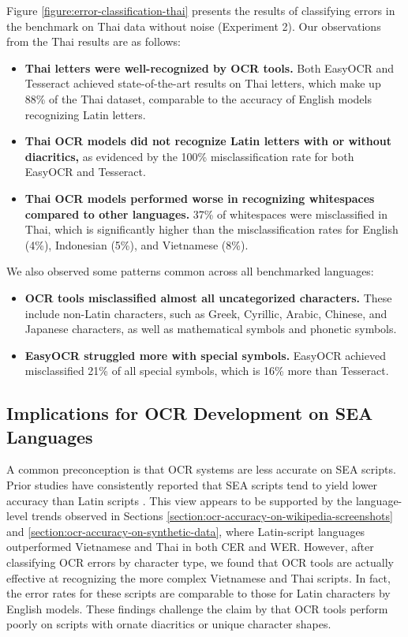 \documentclass[12pt,oneside]{memoir}
\begin{document}
Figure \ref{figure:error-classification-thai} presents the results of classifying errors in the benchmark on Thai data without noise (Experiment 2). Our observations from the Thai results are as follows:

\begin{itemize}
    \item \textbf{Thai letters were well-recognized by OCR tools.} 
    Both EasyOCR and Tesseract achieved state-of-the-art results on Thai letters, which make up 88\% of the Thai dataset, comparable to the accuracy of English models recognizing Latin letters.
    \item \textbf{Thai OCR models did not recognize Latin letters with or without diacritics,} as evidenced by the 100\% misclassification rate for both EasyOCR and Tesseract.
    \item \textbf{Thai OCR models performed worse in recognizing whitespaces compared to other languages.} 37\% of whitespaces were misclassified in Thai, which is significantly higher than the misclassification rates for English (4\%), Indonesian (5\%), and Vietnamese (8\%).
\end{itemize}

We also observed some patterns common across all benchmarked languages:

\begin{itemize}
    \item \textbf{OCR tools misclassified almost all uncategorized characters.} These include non-Latin characters, such as Greek, Cyrillic, Arabic, Chinese, and Japanese characters, as well as mathematical symbols and phonetic symbols.
    \item \textbf{EasyOCR struggled more with special symbols.} EasyOCR achieved misclassified 21\% of all special symbols, which is 16\% more than Tesseract.
\end{itemize}

\subsection{Implications for OCR Development on SEA Languages}

A common preconception is that OCR systems are less accurate on SEA scripts.
Prior studies have consistently reported that SEA scripts tend to yield lower accuracy than Latin scripts \parencite{ignat-etal-2022}.
This view appears to be supported by the language-level trends observed in Sections \ref{section:ocr-accuracy-on-wikipedia-screenshots} and \ref{section:ocr-accuracy-on-synthetic-data}, where Latin-script languages outperformed Vietnamese and Thai in both CER and WER.
However, after classifying OCR errors by character type, we found that OCR tools are actually effective at recognizing the more complex Vietnamese and Thai scripts. In fact, the error rates for these scripts are comparable to those for Latin characters by English models.
These findings challenge the claim by \textcite{agarwal-and-anastasopoulos-2024} that OCR tools perform poorly on scripts with ornate diacritics or unique character shapes.
\end{document}
